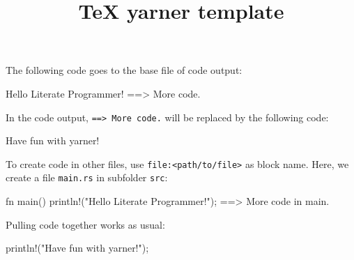 \documentclass[11pt,a4paper]{article}
\title{TeX yarner template}
\begin{document}
\maketitle

The following code goes to the base file of code output:

\begin{code}
Hello Literate Programmer!
==> More code.
\end{code}

In the code output, \verb`==> More code.` will be replaced by the following code:

\begin{code}[name=More code]
Have fun with yarner!
\end{code}

To create code in other files, use \verb`file:<path/to/file>` as block name.
Here, we create a file \verb`main.rs` in subfolder \verb`src`:

\begin{code}[language=rust,name=file:src/main.rs]
fn main() {
    println!("Hello Literate Programmer!");
    ==> More code in main.
}
\end{code}

Pulling code together works as usual:

\begin{code}[language=rust,name=More code in main]
println!("Have fun with yarner!");
\end{code}
\end{document}
